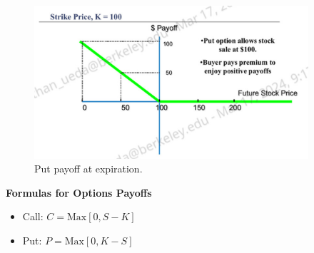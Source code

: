 \documentclass[11pt]{article}
\begin{document}
\begin{figure}[H] 
    \centering 
    \includegraphics[width=4in]{imgs/put_payoff.png}
    \caption{Put payoff at expiration.}
\end{figure}

\textbf{Formulas for Options Payoffs}
\begin{itemize}
    \item Call: $C = \text{Max}[0, S-K]$
    \item Put: $P = \text{Max}[0, K-S]$
\end{itemize}
\end{document}
